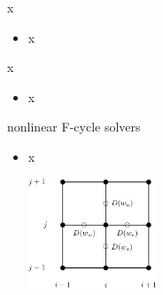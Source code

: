 \documentclass[10pt,
               svgnames,
               hyperref={colorlinks,citecolor=DeepPink4,linkcolor=FireBrick,urlcolor=Maroon},
               usepdftitle=false]{beamer}
\begin{document}
\begin{frame}{x}
\begin{itemize}
\item x
\end{itemize}
\end{frame}

\begin{frame}{x}
\begin{itemize}
\item x
\end{itemize}
\end{frame}


\begin{frame}{nonlinear F-cycle solvers}
\begin{itemize}
\item x

\hfill \includegraphics[width=0.3\textwidth]{images/msboxstencil.png}
\end{itemize}
\end{frame}
\end{document}
